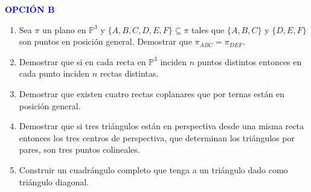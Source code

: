 \documentclass[12pt]{report}
\numberwithin{section}{chapter}
\newcommand{\p}{\mathbb P}
\begin{document}
\vspace{1cm}

\begin{center}
\textcolor{blue}{\textbf{\large OPCIÓN B}}
\end{center}


\begin{enumerate}

\item Sea $\pi$ un plano en $\p^3$ y $\{A,B,C,D,E,F\} \subseteq \pi$ tales que $\{A,B,C\}$ y $\{D,E,F\}$ son puntos en posición general. Demostrar que $\pi_{ABC}=\pi_{DEF}$.


\item Demostrar que si en cada recta en $\p^3$ inciden $n$ puntos distintos entonces en cada punto inciden $n$ rectas distintas.


\item Demostrar que existen cuatro rectas coplanares que por ternas están en posición general.


\item Demostrar que si tres triángulos están en perspectiva desde una misma recta entonces los tres centros de perspectiva, que determinan los triángulos por pares, son tres puntos colineales.


\item Construir un cuadrángulo completo que tenga a un triángulo dado como triángulo diagonal.
\end{enumerate}
\end{document}
